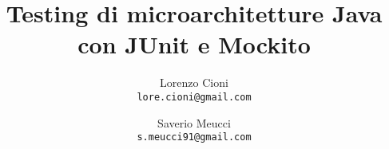 \documentclass[10pt,twocolumn,letterpaper]{article}
\begin{document}
\title{Testing di microarchitetture Java con JUnit e Mockito}

\author{Lorenzo Cioni\\
{\tt\small lore.cioni@gmail.com}
\and
Saverio Meucci\\
{\tt\small s.meucci91@gmail.com}
}

\maketitle
\thispagestyle{empty}











{\small


}
\end{document}
